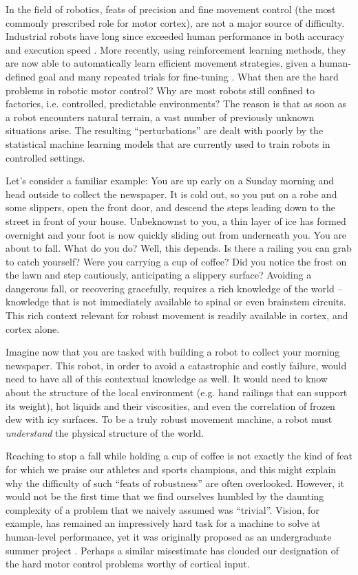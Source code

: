 In the field of robotics, feats of precision and fine movement control (the most commonly prescribed role for motor cortex), are not a major source of difficulty. Industrial robots have long since exceeded human performance in both accuracy and execution speed \cite{Senoo2009}. More recently, using reinforcement learning methods, they are now able to automatically learn efficient movement strategies, given a human-defined goal and many repeated trials for fine-tuning \cite{Coates2008}. What then are the hard problems in robotic motor control? Why are most robots still confined to factories, i.e. controlled, predictable environments? The reason is that as soon as a robot encounters natural terrain, a vast number of previously unknown situations arise. The resulting ``perturbations'' are dealt with poorly by the statistical machine learning models that are currently used to train robots in controlled settings.

Let’s consider a familiar example: You are up early on a Sunday morning and head outside to collect the newspaper. It is cold out, so you put on a robe and some slippers, open the front door, and descend the steps leading down to the street in front of your house. Unbeknownst to you, a thin layer of ice has formed overnight and your foot is now quickly sliding out from underneath you. You are about to fall. What do you do? Well, this depends. Is there a railing you can grab to catch yourself? Were you carrying a cup of coffee? Did you notice the frost on the lawn and step cautiously, anticipating a slippery surface? Avoiding a dangerous fall, or recovering gracefully, requires a rich knowledge of the world -- knowledge that is not immediately available to spinal or even brainstem circuits. This rich context relevant for robust movement is readily available in cortex, and cortex alone.

Imagine now that you are tasked with building a robot to collect your morning newspaper. This robot, in order to avoid a catastrophic and costly failure, would need to have all of this contextual knowledge as well. It would need to know about the structure of the local environment (e.g. hand railings that can support its weight), hot liquids and their viscosities, and even the correlation of frozen dew with icy surfaces. To be a truly robust movement machine, a robot must \emph{understand} the physical structure of the world.

Reaching to stop a fall while holding a cup of coffee is not exactly the kind of feat for which we praise our athletes and sports champions, and this might explain why the difficulty of such ``feats of robustness'' are often overlooked. However, it would not be the first time that we find ourselves humbled by the daunting complexity of a problem that we naively assumed was ``trivial''. Vision, for example, has remained an impressively hard task for a machine to solve at human-level performance, yet it was originally proposed as an undergraduate summer project \cite{Papert1966}. Perhaps a similar misestimate has clouded our designation of the hard motor control problems worthy of cortical input.

